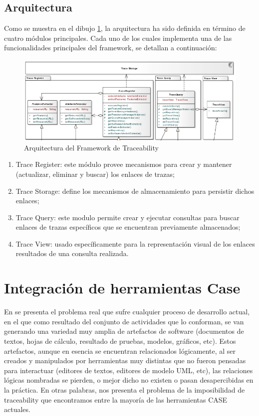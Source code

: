 \documentclass[a4paper,12pt,oneside]{book}
\begin{document}
\subsection{Arquitectura}

Como se muestra en el dibujo \ref{fig:SPLArquitectura}, la arquitectura ha sido definida en término de cuatro módulos principales. Cada uno de los cuales implementa una de las funcionalidades principales del framework, se detallan a continuación:

\begin{figure}[hbtp]
\centering
\includegraphics[scale=.55]{./img/ArquitecturaTraceabilityFramework}
\caption{Arquitectura del Framework de Traceability}
\label{fig:SPLArquitectura}
\end{figure}

\begin{enumerate}
\item    Trace Register: este módulo provee mecanismos para crear y mantener (actualizar, eliminar y buscar) los enlaces de trazas;
\item     Trace Storage: define los mecanismos de almacenamiento para persistir dichos enlaces;
\item     Trace Query: este modulo permite crear y ejecutar consultas para buscar enlaces de trazas específicos que se encuentran previamente almacenados;
\item     Trace View: usado específicamente para la representación visual de los enlaces resultados de una consulta realizada.
\end{enumerate}


\section{Integración de herramientas Case}

En \cite{KlarRoseSchurr} se presenta el problema real que sufre cualquier proceso de desarrollo actual, en el que como resultado del conjunto de actividades que lo conforman, se van generando una variedad muy amplia de artefactos de software (documentos de textos, hojas de cálculo, resultado de pruebas, modelos, gráficos, etc). Estos artefactos, aunque en esencia  se encuentran relacionados lógicamente, al ser creados y manipulados por herramientas muy distintas que no fueron pensadas para interactuar (editores de textos, editores de modelo UML, etc), las relaciones lógicas nombradas se pierden, o mejor dicho no existen o pasan desapercibidas en la práctica. En otras palabras, nos presenta el problema de la imposibilidad de traceability que encontramos entre la mayoría de las herramientas CASE actuales. 
\end{document}
